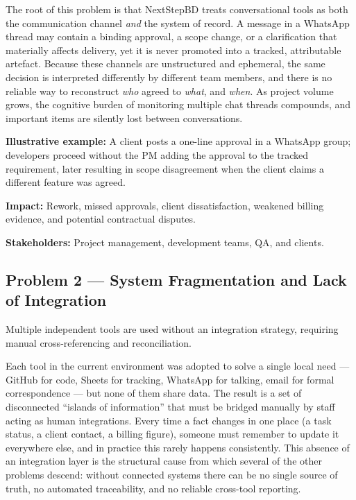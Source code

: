 \documentclass[12pt,a4paper]{report}
\begin{document}
The root of this problem is that NextStepBD treats conversational tools as both the communication channel \emph{and} the system of record. A message in a WhatsApp thread may contain a binding approval, a scope change, or a clarification that materially affects delivery, yet it is never promoted into a tracked, attributable artefact. Because these channels are unstructured and ephemeral, the same decision is interpreted differently by different team members, and there is no reliable way to reconstruct \emph{who} agreed to \emph{what}, and \emph{when}. As project volume grows, the cognitive burden of monitoring multiple chat threads compounds, and important items are silently lost between conversations.

\textbf{Illustrative example:} A client posts a one-line approval in a WhatsApp group; developers proceed without the PM adding the approval to the tracked requirement, later resulting in scope disagreement when the client claims a different feature was agreed.

\textbf{Impact:} Rework, missed approvals, client dissatisfaction, weakened billing evidence, and potential contractual disputes.

\textbf{Stakeholders:} Project management, development teams, QA, and clients.

\subsection{Problem 2 --- System Fragmentation and Lack of Integration}
\begin{problemBox}
Multiple independent tools are used without an integration strategy, requiring manual cross-referencing and reconciliation.
\end{problemBox}

Each tool in the current environment was adopted to solve a single local need --- GitHub for code, Sheets for tracking, WhatsApp for talking, email for formal correspondence --- but none of them share data. The result is a set of disconnected ``islands of information'' that must be bridged manually by staff acting as human integrations. Every time a fact changes in one place (a task status, a client contact, a billing figure), someone must remember to update it everywhere else, and in practice this rarely happens consistently. This absence of an integration layer is the structural cause from which several of the other problems descend: without connected systems there can be no single source of truth, no automated traceability, and no reliable cross-tool reporting.
\end{document}
